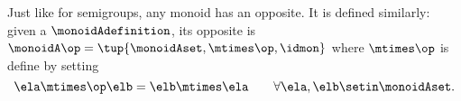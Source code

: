 %
%
%
%

\begin{remark}
    Just like for semigroups, any monoid has an opposite.
    It is defined similarly: given a  $\monoidAdefinition$, its opposite is $\monoidA \op = \tup{ \monoidAset, \mtimes\op, \idmon }$ where $\mtimes\op$ is define by setting
    \begin{equation}
        \ela \mtimes \op \elb = \elb \mtimes \ela \qquad \forall \ela, \elb \setin \monoidAset.
    \end{equation}
\end{remark}

